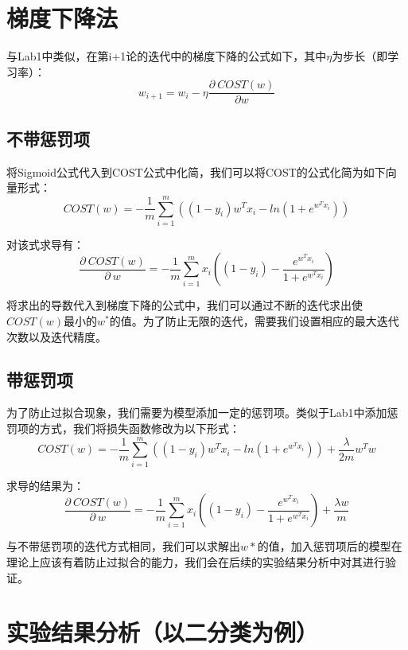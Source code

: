 \documentclass[12pt]{article}
\begin{document}
\section{梯度下降法}
与Lab1中类似，在第i+1论的迭代中的梯度下降的公式如下，其中$\eta$为步长（即学习率）：
\[w_{i+1}=w_i-\eta\frac{\partial\ COST(w)}{\partial w}\]
\subsection{不带惩罚项}
将Sigmoid公式代入到COST公式中化简，我们可以将COST的公式化简为如下向量形式：
\[COST(w)=-\frac{1}{m}\sum_{i=1}^{m}((1-y_i)w^Tx_i-ln(1+e^{w^Tx_i}))\]\par
对该式求导有：
\[\frac{\partial\ COST(w)}{\partial\ w}=-\frac{1}{m}\sum_{i=1}^mx_i((1-y_i)-\frac{e^{w^Tx_i}}{1+e^{w^Tx_i}})\]\par
将求出的导数代入到梯度下降的公式中，我们可以通过不断的迭代求出使$COST(w)$最小的$w^*$的值。为了防止无限的迭代，需要我们设置相应的最大迭代次数以及迭代精度。
\subsection{带惩罚项}
为了防止过拟合现象，我们需要为模型添加一定的惩罚项。类似于Lab1中添加惩罚项的方式，我们将损失函数修改为以下形式：
\[COST(w)=-\frac{1}{m}\sum_{i=1}^{m}((1-y_i)w^Tx_i-ln(1+e^{w^Tx_i}))+\frac{\lambda}{2m}w^Tw\]\par
求导的结果为：
\[\frac{\partial\ COST(w)}{\partial\ w}=-\frac{1}{m}\sum_{i=1}^mx_i((1-y_i)-\frac{e^{w^Tx_i}}{1+e^{w^Tx_i}})+\frac{\lambda w}{m}\]\par
与不带惩罚项的迭代方式相同，我们可以求解出$w*$的值，加入惩罚项后的模型在理论上应该有着防止过拟合的能力，我们会在后续的实验结果分析中对其进行验证。
\section{实验结果分析（以二分类为例）}
\end{document}
